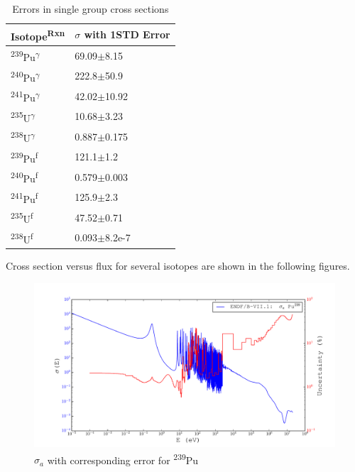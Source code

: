 \documentclass[11pt,notitlepage]{article}
\newcommand{\tss}{\textsuperscript}
\begin{document}
\begin{todolist}
  \begin{table}[H]
  \begin{center}
    \caption{Errors in single group cross sections}
    \label{Table:4}
    \begin{tabular}{l l}
      \toprule
      Isotope\tss{Rxn} & $\sigma$ with 1STD Error\\
      \hline
      \tss{239}Pu\tss{$\gamma$} & 69.09$\pm$8.15\\
      \tss{240}Pu\tss{$\gamma$} & 222.8$\pm$50.9\\
      \tss{241}Pu\tss{$\gamma$} & 42.02$\pm$10.92\\
      \tss{235}U\tss{$\gamma$}  & 10.68$\pm$3.23\\
      \tss{238}U\tss{$\gamma$}  & 0.887$\pm$0.175\\
      \tss{239}Pu\tss{f} & 121.1$\pm$1.2 \\
      \tss{240}Pu\tss{f} & 0.579$\pm$0.003 \\
      \tss{241}Pu\tss{f} & 125.9$\pm$2.3 \\
      \tss{235}U\tss{f}  & 47.52$\pm$0.71 \\
      \tss{238}U\tss{f}  & 0.093$\pm$8.2e-7 \\
      \bottomrule
    \end{tabular}
  \end{center}
  \end{table}


  
  Cross section versus flux for several isotopes are shown in the
  following figures.

  \begin{figure}[H]
    \begin{center}
      \includegraphics[width=0.9\columnwidth]{../Weighting/X_Sections/XwVar_Pu_239_94_a.pdf}
      \vspace{-5mm}
      \caption{$\sigma_a$ with corresponding error for \tss{239}Pu}
      \label{fig:XPu239}
    \end{center}
  \end{figure}


\end{todolist}
\end{document}
